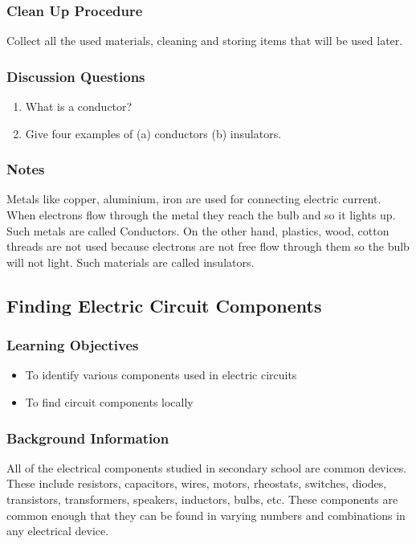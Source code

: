 \subsubsection*{Clean Up Procedure}
Collect all the used materials, cleaning and storing items that will be used later.

\subsubsection*{Discussion Questions}
\begin{enumerate}
\item{What is a conductor?}
\item{Give four examples of (a) conductors (b) insulators.} 
\end{enumerate}

\subsubsection*{Notes}
Metals like copper, aluminium, iron are used for connecting electric current. When electrons flow through the metal they reach the bulb and so it lights up. Such metals are called Conductors. On the other hand, plastics, wood, cotton threads are not used because electrons are not free flow through them so the bulb will not light. Such materials are called insulators. 


\subsection{Finding Electric Circuit Components}

\subsubsection*{Learning Objectives}
\begin{itemize}
\item{To identify various components used in electric circuits} 
\item{To find circuit components locally} 
\end{itemize}

\subsubsection*{Background Information}
All of the electrical components studied in secondary school are common devices. These include resistors, capacitors, wires, motors, rheostats, switches, diodes, transistors, transformers, speakers, inductors, bulbs, etc. These components are common enough that they can be found in varying numbers and combinations in any electrical device. 

